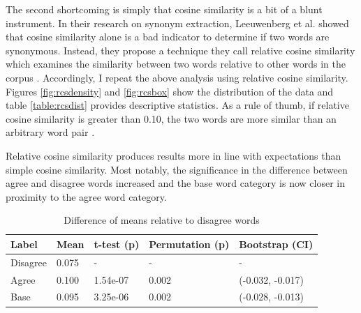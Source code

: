 \documentclass[../embeddings.tex]{subfiles}
\begin{document}
The second shortcoming is simply that cosine similarity is a bit of a blunt instrument. In their research on synonym extraction, Leeuwenberg et al. showed that cosine similarity alone is a bad indicator to determine if two words are synonymous. Instead, they propose a technique they call relative cosine similarity which examines the similarity between two words relative to other words in the corpus \cite{leeuwenberg2016minimally}.  Accordingly, I repeat the above analysis using relative cosine similarity. Figures \ref{fig:rcsdensity} and \ref{fig:rcsbox} show the distribution of the data and table \ref{table:rcsdist} provides descriptive statistics. As a rule of thumb, if relative cosine similarity is greater than 0.10, the two words are more similar than an arbitrary word pair \cite{rehurek_lrec}.



Relative cosine similarity produces results more in line with expectations than simple cosine similarity. Most notably, the significance in the difference between agree and disagree words increased and the base word category is now closer in proximity to the agree word category. 

\begin{table}[h]
    \caption{Difference of means relative to disagree words}
    \begin{tabular}{lllll}
      \toprule
      Label    & Mean  & t-test (p) & Permutation (p) & Bootstrap (CI)\\
      \midrule
      Disagree & 0.075  & -          & -               & -\\
      Agree    & 0.100  & 1.54e-07   & 0.002           & (-0.032, -0.017)\\
      Base     & 0.095  & 3.25e-06   & 0.002            & (-0.028, -0.013)\\
      \bottomrule
    \end{tabular}
    \label{table:rcs}
\end{table}
\end{document}
